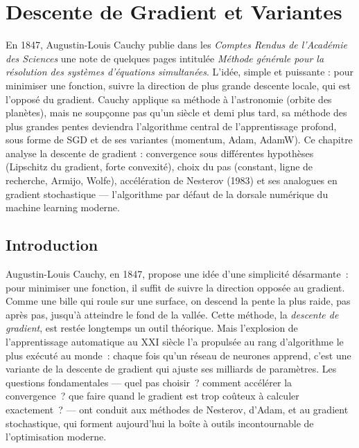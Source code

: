 \chapter{Descente de Gradient et Variantes}
\label{ch:gradient}

En 1847, Augustin-Louis Cauchy publie dans les \emph{Comptes Rendus de l'Académie des Sciences} une note de quelques pages intitulée \emph{Méthode générale pour la résolution des systèmes d'équations simultanées}. L'idée, simple et puissante : pour minimiser une fonction, suivre la direction de plus grande descente locale, qui est l'opposé du gradient. Cauchy applique sa méthode à l'astronomie (orbite des planètes), mais ne soupçonne pas qu'un siècle et demi plus tard, sa méthode des plus grandes pentes deviendra l'algorithme central de l'apprentissage profond, sous forme de SGD et de ses variantes (momentum, Adam, AdamW). Ce chapitre analyse la descente de gradient : convergence sous différentes hypothèses (Lipschitz du gradient, forte convexité), choix du pas (constant, ligne de recherche, Armijo, Wolfe), accélération de Nesterov (1983) et ses analogues en gradient stochastique --- l'algorithme par défaut de la dorsale numérique du machine learning moderne.

\section{Introduction}

Augustin-Louis Cauchy, en 1847, propose une id\'ee d'une simplicit\'e d\'esarmante~: pour minimiser une fonction, il suffit de suivre la direction oppos\'ee au gradient. Comme une bille qui roule sur une surface, on descend la pente la plus raide, pas apr\`es pas, jusqu'\`a atteindre le fond de la vall\'ee. Cette m\'ethode, la \emph{descente de gradient}, est rest\'ee longtemps un outil th\'eorique. Mais l'explosion de l'apprentissage automatique au XXI\ieme{} si\`ecle l'a propuls\'ee au rang d'algorithme le plus ex\'ecut\'e au monde~: chaque fois qu'un r\'eseau de neurones apprend, c'est une variante de la descente de gradient qui ajuste ses milliards de param\`etres. Les questions fondamentales --- quel pas choisir~? comment acc\'el\'erer la convergence~? que faire quand le gradient est trop co\^uteux \`a calculer exactement~? --- ont conduit aux m\'ethodes de Nesterov, d'Adam, et au gradient stochastique, qui forment aujourd'hui la bo\^ite \`a outils incontournable de l'optimisation moderne.

